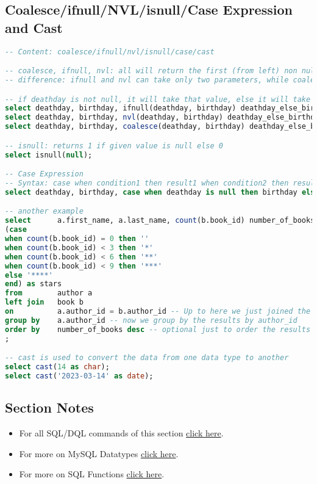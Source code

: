 \subsection{Coalesce/ifnull/NVL/isnull/Case Expression and Cast}
\begin{lstlisting}[language=SQL]
-- Content: coalesce/ifnull/nvl/isnull/case/cast

-- coalesce, ifnull, nvl: all will return the first (from left) non null values
-- difference: ifnull and nvl can take only two parameters, while coalesce can take more than two

-- if deathday is not null, it will take that value, else it will take the next one, birthday
select deathday, birthday, ifnull(deathday, birthday) deathday_else_birthday from author;
select deathday, birthday, nvl(deathday, birthday) deathday_else_birthday from author; -- nvl is Oracle based
select deathday, birthday, coalesce(deathday, birthday) deathday_else_birthday from author;

-- isnull: returns 1 if given value is null else 0
select isnull(null);

-- Case Expression
-- Syntax: case when condition1 then result1 when condition2 then result2 .... else result end
select deathday, birthday, case when deathday is null then birthday else deathday end deathday_else_birthday from author;

-- another example
select		a.first_name, a.last_name, count(b.book_id) number_of_books, -- print only first, last name and number of books
(case
when count(b.book_id) = 0 then ''
when count(b.book_id) < 3 then '*'
when count(b.book_id) < 6 then '**'
when count(b.book_id) < 9 then '***'
else '****'
end) as stars
from		author a
left join	book b
on			a.author_id = b.author_id -- Up to here we just joined the all authors with their books
group by	a.author_id -- now we group by the results by author_id
order by	number_of_books desc -- optional just to order the results based on the number of books
;

-- cast is used to convert the data from one data type to another
select cast(14 as char);
select cast('2023-03-14' as date);
\end{lstlisting}
\subsection{Section Notes}
\begin{itemize}
	\item For all \acs{SQL}/\acs{DQL} commands of this section \href{file:./source-items/sql/4-sql-dql.sql}{click here}.
	\item For more on MySQL Datatypes \href{https://dev.mysql.com/doc/refman/8.0/en/data-types.html}{click here}.
	\item For more on \acs{SQL} Functions \href{https://dev.mysql.com/doc/refman/8.0/en/functions.html}{click here}.
\end{itemize}
